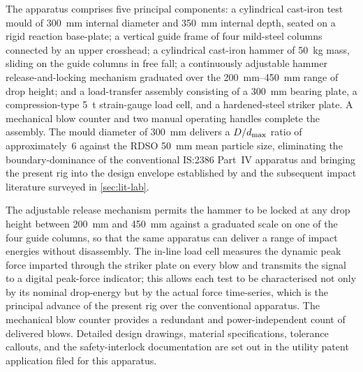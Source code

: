 The apparatus comprises five principal components: a cylindrical cast-iron
test mould of \SI{300}{\milli\metre} internal diameter and
\SI{350}{\milli\metre} internal depth, seated on a rigid reaction
base-plate; a vertical guide frame of four mild-steel columns connected by
an upper crosshead; a cylindrical cast-iron hammer of \SI{50}{\kilogram}
mass, sliding on the guide columns in free fall; a continuously adjustable
hammer release-and-locking mechanism graduated over the
\SIrange{200}{450}{\milli\metre} range of drop height; and a load-transfer
assembly consisting of a \SI{300}{\milli\metre} bearing plate, a
compression-type \SI{5}{\tonne} strain-gauge load cell, and a hardened-steel
striker plate. A mechanical blow counter and two manual operating handles
complete the assembly. The mould diameter of \SI{300}{\milli\metre} delivers
a $D/d_{\max}$ ratio of approximately~6 against the \gls{RDSO}
\SI{50}{\milli\metre} mean particle size, eliminating the boundary-dominance
of the conventional IS:2386 Part~IV apparatus \citep{BIS1963} and bringing
the present rig into the design envelope established by
\citet{Nimbalkar2012} and the subsequent impact literature surveyed in
\cref{sec:lit-lab}.

The adjustable release mechanism permits the hammer to be locked at any
drop height between \SI{200}{\milli\metre} and \SI{450}{\milli\metre}
against a graduated scale on one of the four guide columns, so that the
same apparatus can deliver a range of impact energies without disassembly.
The in-line load cell measures the dynamic peak force imparted through the
striker plate on every blow and transmits the signal to a digital
peak-force indicator; this allows each test to be characterised not only by
its nominal drop-energy but by the actual force time-series, which is the
principal advance of the present rig over the conventional apparatus. The
mechanical blow counter provides a redundant and power-independent count of
delivered blows. Detailed design drawings, material specifications,
tolerance callouts, and the safety-interlock documentation are set out in
the utility patent application filed for this apparatus.

